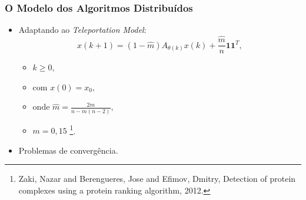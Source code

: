 \documentclass{beamer}
\begin{document}
\begin{frame}
	\frametitle{O Modelo dos Algoritmos Distribuídos}

\begin{itemize}
\item Adaptando ao \textit{Teleportation Model}:
%
\begin{equation}
x(k+1) = (1 - \hat{m})A_{\theta(k)}x(k) + \frac{\hat{m}}{n}\textbf{11}^T, 
\end{equation}

	\begin{itemize}
	\item $k \geq 0,$ 
	\item com $x(0) = x_0,$
	\item onde $\hat{m} = \frac{2m}{n-m(n-2)},$
	\item $m = 0,15$ \footnote{\tiny \justifying Zaki, Nazar and Berengueres, Jose and Efimov, Dmitry, Detection of protein complexes using a protein ranking algorithm, 2012.}.
	\end{itemize}

\vspace{0.2cm}
\item Problemas de convergência.
\end{itemize}

\end{frame}
\end{document}
